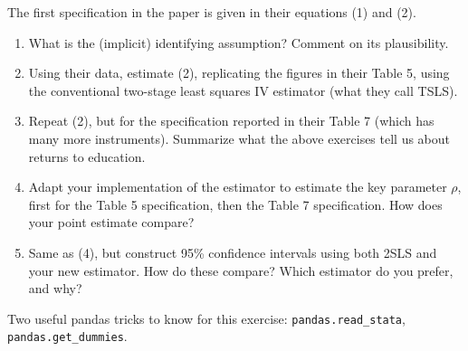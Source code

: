 \documentclass[12pt]{amsart}
\begin{document}
The first specification in the paper is given in their equations (1)
and (2).

\begin{enumerate}
\item What is the (implicit) identifying assumption?  Comment on
its plausibility.
\item Using their data, estimate (2), replicating the
figures in their Table 5, using the conventional two-stage least squares IV estimator
(what they call TSLS).
\item Repeat (2), but for the specification reported in their Table 7
(which has many more instruments).  Summarize what the above
exercises tell us about returns to education.
\item Adapt your implementation of the \citeauthor{chernozhukov-hansen08} estimator to estimate the key parameter \(\rho\), first for the Table 5 specification, then the Table 7 specification.  How does your point estimate compare?
\item Same as (4), but construct 95\% confidence intervals using both 2SLS and your new estimator.  How do these compare?  Which estimator do you prefer, and why?
\end{enumerate}

Two useful pandas tricks to know for this exercise:
\texttt{pandas.read\_stata}, \texttt{pandas.get\_dummies}.
\printbibliography
\end{document}
